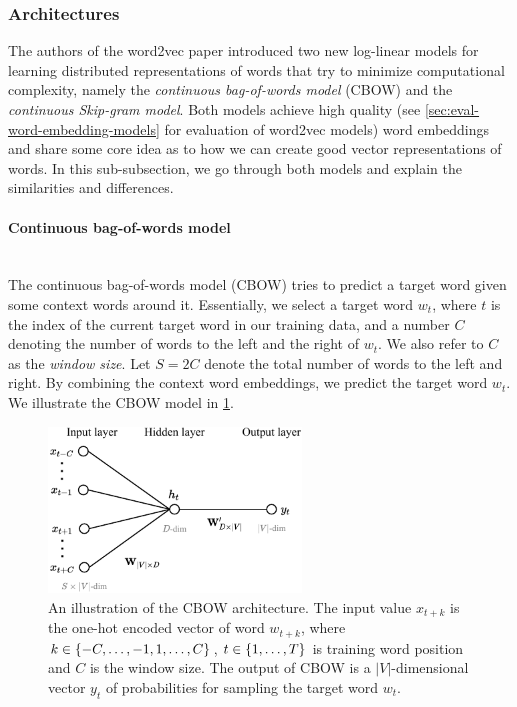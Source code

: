 \subsubsection{Architectures}
The authors of the word2vec paper introduced two new log-linear models for learning distributed representations of words that try to minimize computational complexity, namely the \textit{continuous bag-of-words model} (CBOW) and the \textit{continuous Skip-gram model}. Both models achieve high quality (see \cref{sec:eval-word-embedding-models} for evaluation of word2vec models) word embeddings and share some core idea as to how we can create good vector representations of words. In this sub-subsection, we go through both models and explain the similarities and differences.

\paragraph*{Continuous bag-of-words model}\mbox{} \\
The continuous bag-of-words model (CBOW) tries to predict a target word given some context words around it. Essentially, we select a target word $w_t$, where $t$ is the index of the current target word in our training data, and a number $C$ denoting the number of words to the left and the right of $w_t$. We also refer to $C$ as the \textit{window size}. Let $S=2C$ denote the total number of words to the left and right. By combining the context word embeddings, we predict the target word $w_t$. We illustrate the CBOW model in \cref{fig:cbow-model}.
\begin{figure}[H]
    \centering
    \includegraphics[width=0.6\textwidth]{thesis/figures/cbow_cropped.pdf}
    \caption{An illustration of the CBOW architecture. The input value $x_{t+k}$ is the one-hot encoded vector of word $w_{t+k}$, where $k \in \left\{-C, \ldots, -1, 1, \ldots, C\right\}$, $t \in \left\{1, \ldots, T\right\}$ is training word position and $C$ is the window size. The output of CBOW is a $|V|$-dimensional vector $y_t$ of probabilities for sampling the target word $w_t$.}
    \label{fig:cbow-model}
\end{figure}

